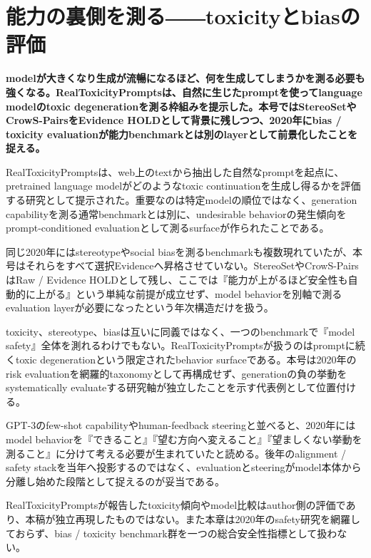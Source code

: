\section{能力の裏側を測る――toxicityとbiasの評価}
\label{pkg:evaluation-risk}
\noindent\textbf{modelが大きくなり生成が流暢になるほど、何を生成してしまうかを測る必要も強くなる。RealToxicityPromptsは、自然に生じたpromptを使ってlanguage modelのtoxic degenerationを測る枠組みを提示した。本号ではStereoSetやCrowS-PairsをEvidence HOLDとして背景に残しつつ、2020年にbias / toxicity evaluationが能力benchmarkとは別のlayerとして前景化したことを捉える。}\autocite{src-308178e74f55}

RealToxicityPromptsは、web上のtextから抽出した自然なpromptを起点に、pretrained language modelがどのようなtoxic continuationを生成し得るかを評価する研究として提示された。重要なのは特定modelの順位ではなく、generation capabilityを測る通常benchmarkとは別に、undesirable behaviorの発生傾向をprompt-conditioned evaluationとして測るsurfaceが作られたことである。\autocite{src-308178e74f55}


同じ2020年にはstereotypeやsocial biasを測るbenchmarkも複数現れていたが、本号はそれらをすべて選択Evidenceへ昇格させていない。StereoSetやCrowS-PairsはRaw / Evidence HOLDとして残し、ここでは『能力が上がるほど安全性も自動的に上がる』という単純な前提が成立せず、model behaviorを別軸で測るevaluation layerが必要になったという年次構造だけを扱う。\autocite{src-308178e74f55}


toxicity、stereotype、biasは互いに同義ではなく、一つのbenchmarkで『model safety』全体を測れるわけでもない。RealToxicityPromptsが扱うのはpromptに続くtoxic degenerationという限定されたbehavior surfaceである。本号は2020年のrisk evaluationを網羅的taxonomyとして再構成せず、generationの負の挙動をsystematically evaluateする研究軸が独立したことを示す代表例として位置付ける。\autocite{src-308178e74f55}


GPT-3のfew-shot capabilityやhuman-feedback steeringと並べると、2020年にはmodel behaviorを『できること』『望む方向へ変えること』『望ましくない挙動を測ること』に分けて考える必要が生まれていたと読める。後年のalignment / safety stackを当年へ投影するのではなく、evaluationとsteeringがmodel本体から分離し始めた段階として捉えるのが妥当である。\autocite{src-308178e74f55}


\begin{claimboundary}
RealToxicityPromptsが報告したtoxicity傾向やmodel比較はauthor側の評価であり、本稿が独立再現したものではない。また本章は2020年のsafety研究を網羅しておらず、bias / toxicity benchmark群を一つの総合安全性指標として扱わない。\autocite{src-308178e74f55}
\end{claimboundary}
